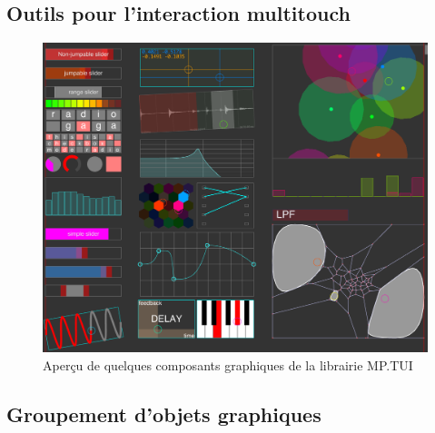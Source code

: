 \subsection{Outils pour l'interaction multitouch}

\begin{figure}[!htbp]
	\includegraphics[width=\textwidth]{gfx/mpTUI/mp-TUI-preview.png}
	\caption{Aperçu de quelques composants graphiques de la librairie MP.TUI}
	\label{fig:visual_representation:mp.TUI}
\end{figure}



\subsection{Groupement d'objets graphiques}

